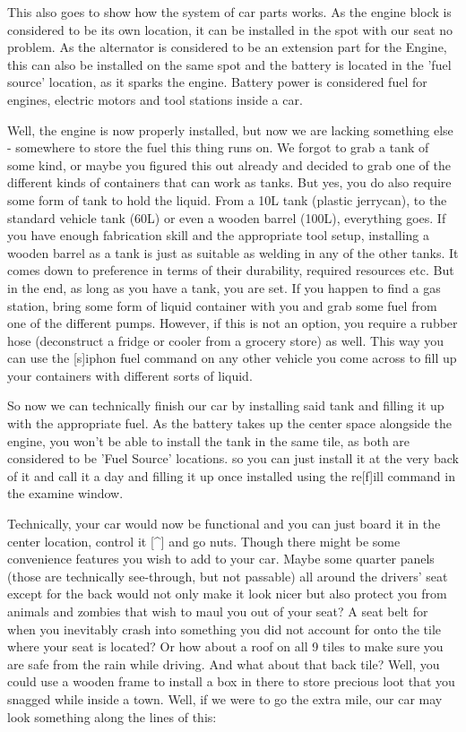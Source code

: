 This also goes to show how the system of car parts works. As the engine block is considered to be its own location, it can be installed in the spot with our seat no problem. As the alternator is considered to be an extension part for the Engine, this can also be installed on the same spot and the battery is located in the 'fuel source' location, as it sparks the engine. Battery power is considered fuel for engines, electric motors and tool stations inside a car.

Well, the engine is now properly installed, but now we are lacking something else - somewhere to store the fuel this thing runs on. We forgot to grab a tank of some kind, or maybe you figured this out already and decided to grab one of the different kinds of containers that can work as tanks. But yes, you do also require some form of tank to hold the liquid. From a 10L tank (plastic jerrycan), to the standard vehicle tank (60L) or even a wooden barrel (100L), everything goes. If you have enough fabrication skill and the appropriate tool setup, installing a wooden barrel as a tank is just as suitable as welding in any of the other tanks. It comes down to preference in terms of their durability, required resources etc. But in the end, as long as you have a tank, you are set. If you happen to find a gas station, bring some form of liquid container with you and grab some fuel from one of the different pumps. However, if this is not an option, you require a rubber hose (deconstruct a fridge or cooler from a grocery store) as well. This way you can use the [s]iphon fuel command on any other vehicle you come across to fill up your containers with different sorts of liquid.

So now we can technically finish our car by installing said tank and filling it up with the appropriate fuel. As the battery takes up the center space alongside the engine, you won't be able to install the tank in the same tile, as both are considered to be 'Fuel Source' locations. so you can just install it at the very back of it and call it a day and filling it up once installed using the re[f]ill command in the examine window.

Technically, your car would now be functional and you can just board it in the center location, control it [\^{}] and go nuts. Though there might be some convenience features you wish to add to your car. Maybe some quarter panels (those are technically see-through, but not passable) all around the drivers' seat except for the back would not only make it look nicer but also protect you from animals and zombies that wish to maul you out of your seat? A seat belt for when you inevitably crash into something you did not account for onto the tile where your seat is located? Or how about a roof on all 9 tiles to make sure you are safe from the rain while driving. And what about that back tile? Well, you could use a wooden frame to install a box in there to store precious loot that you snagged while inside a town.
Well, if we were to go the extra mile, our car may look something along the lines of this:

